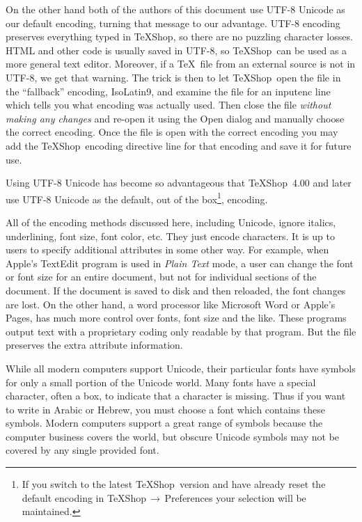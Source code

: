 \documentclass[letterpaper,11pt]{article}
\newcommand{\TS}{\textsf{\TeX Shop}}
\newcommand{\acr}[1]{\textsf{#1}}
\newcommand{\cmd}[1]{\textsf{#1}}
\newcommand{\mnu}[1]{\textsf{#1}}
\newcommand{\To}{\,\(\to\)\,}
\begin{document}
On the other hand both of the authors of this document use \acr{UTF-8 Unicode} as our default encoding, turning that message to our advantage. \acr{UTF-8} encoding preserves everything typed in \TS, so there are no puzzling character losses. HTML and other code is usually saved in \acr{UTF-8}, so \TS\ can be used as a more general text editor. Moreover, if a \TeX\ file from an external source is not in \acr{UTF-8}, we get that warning. The trick is then to let \TS\ open the file in the ``fallback'' encoding, \acr{IsoLatin9}, and examine the file for an \cmd{inputenc} line which tells you what encoding was actually used. Then close the file \emph{without making any changes} and re-open it using the \cmd{Open} dialog and manually choose the correct encoding. Once the file is open with the correct encoding you may add the \TS\ encoding directive line for that encoding and save it for future use.

Using \acr{UTF-8 Unicode} has become so advantageous that \TS\ 4.00 and later use \acr{UTF-8 Unicode} as the default, out of the box\footnote{If you switch to the latest \TS\ version and have already reset the default encoding in \mnu{TeXShop}\To\mnu{Preferences} your selection will be maintained.}, encoding.

All of the encoding methods discussed here, including \cmd{Unicode}, ignore italics, underlining, font size, font color, etc. They just encode characters. It is up to users to specify additional attributes in some other way. For example, when Apple's \cmd{TextEdit} program is used in \emph{Plain Text} mode, a user can change the font or font size for an entire document, but not for individual sections of the document. If the document is saved to disk and then reloaded, the font changes are lost. On the other hand, a word processor like Microsoft Word or Apple's Pages, has much more control over fonts, font size and the like. These programs output text with a proprietary coding only readable by that program. But the file preserves the extra attribute information.  

While all modern computers support \acr{Unicode}, their particular fonts have symbols for only a small portion of the \acr{Unicode} world. Many fonts have a special character, often a box, to
indicate that a character is missing. Thus if you want to write in Arabic or Hebrew, you must choose a font which contains these symbols. Modern computers support a great range of symbols because the computer business covers the world, but obscure \acr{Unicode} symbols may not be covered by any single provided font.
\end{document}
